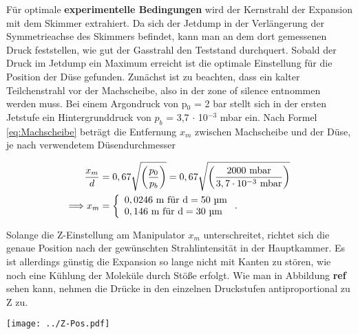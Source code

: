 Für optimale \textbf{experimentelle Bedingungen} wird der Kernstrahl der Expansion mit dem Skimmer extrahiert. Da sich der Jetdump in der Verlängerung der Symmetrieachse des Skimmers befindet, kann man an dem dort gemessenen Druck feststellen, wie gut der Gasstrahl den Teststand durchquert.
Sobald der Druck im Jetdump ein Maximum erreicht ist die optimale Einstellung für die Position der Düse gefunden. Zunächst ist zu beachten, dass ein kalter Teilchenstrahl vor der Machscheibe, also in der zone of silence entnommen werden muss.
Bei einem Argondruck von p$_0$ = 2 bar stellt sich in der ersten Jetstufe ein Hintergrunddruck von $p_b$ = 3,7 $\cdot$ 10$^{-3}$ mbar ein. Nach Formel \ref{eq:Machscheibe} beträgt die Entfernung $x_m$ zwischen Machscheibe und der Düse, je nach verwendetem Düsendurchmesser

\begin{equation}
   \begin{split}
   \frac{x_m}{d} & =0,67 \sqrt{\left(\frac{p_0}{p_b}\right)} = 0,67 \sqrt{\left(\frac{2000 \ \textmd{mbar}}{3,7 \cdot 10^{-3}\ \textmd{mbar}}\right)}\\ 
   \Longrightarrow x_m  & =  
   \left\{ %
   \begin{array}{l}
   0,0246\ \textmd{m} \textmd{ für d}= 50 \textmd{ µm} \\ 
   0,146\ \textmd{m} \textmd{ für d}= 30 \textmd{ µm}
   \end{array}
   \right. .
   \end{split}
\end{equation}

Solange die Z-Einstellung am Manipulator $x_m$ unterschreitet, richtet sich die genaue Position nach der gewünschten Strahlintensität in der Hauptkammer. Es ist allerdings günstig die Expansion so lange nicht mit Kanten zu stören, wie noch eine Kühlung der Moleküle durch Stöße erfolgt. Wie man in Abbildung \textbf{ref} sehen kann, nehmen die Drücke in den einzelnen Druckstufen antiproportional zu Z zu. 

\begin{center}
\begin{minipage}{\linewidth}
\centering
\texttt{[image: ../Z-Pos.pdf]}%
 \label{fig:Dump}
\end{minipage} 
\end{center} 

